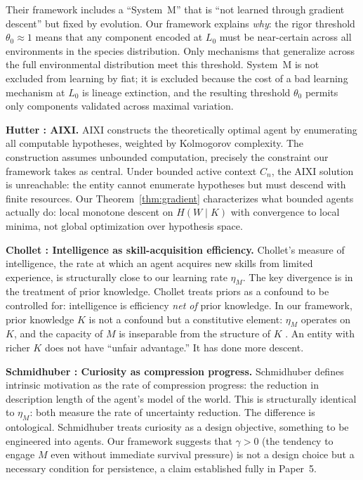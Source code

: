 \documentclass[11pt]{article}
\theoremstyle{definition}
\begin{document}
Their framework includes a ``System~M'' that is ``not learned through
gradient descent'' but fixed by evolution. Our framework explains
\emph{why}: the rigor threshold $\theta_0 \approx 1$ means that any
component encoded at $L_0$ must be near-certain across all
environments in the species distribution. Only mechanisms that
generalize across the full environmental distribution meet this
threshold. System~M is not excluded from learning by fiat; it
is excluded because the cost of a bad learning mechanism at $L_0$ is
lineage extinction, and the resulting threshold $\theta_0$ permits
only components validated across maximal variation.

\textbf{Hutter \cite{Hutter2005}: AIXI.}
AIXI constructs the theoretically optimal agent by enumerating all
computable hypotheses, weighted by Kolmogorov complexity. The
construction assumes unbounded computation, precisely the
constraint our framework takes as central. Under bounded active
context $C_n$, the AIXI solution is unreachable: the entity cannot
enumerate hypotheses but must descend with finite resources. Our
Theorem~\ref{thm:gradient} characterizes what bounded agents actually
do: local monotone descent on $H(W \mid K)$ with convergence to local
minima, not global optimization over hypothesis space.

\textbf{Chollet \cite{Chollet2019}: Intelligence as
skill-acquisition efficiency.}
Chollet's measure of intelligence, the rate at which an agent
acquires new skills from limited experience, is structurally close
to our learning rate $\eta_M$. The key divergence is in the treatment
of prior knowledge. Chollet treats priors as a confound to be
controlled for: intelligence is efficiency \emph{net of} prior
knowledge. In our framework, prior knowledge $K$ is not a confound
but a constitutive element: $\eta_M$ operates on $K$, and the
capacity of $M$ is inseparable from the structure of $K$
\cite{McCarthy2026c}. An entity with richer $K$ does not have
``unfair advantage.'' It has done more descent.

\textbf{Schmidhuber \cite{Schmidhuber2010}: Curiosity as compression
progress.}
Schmidhuber defines intrinsic motivation as the rate of compression
progress: the reduction in description length of the agent's model
of the world. This is structurally identical to $\eta_M$: both
measure the rate of uncertainty reduction. The difference is
ontological. Schmidhuber treats curiosity as a design objective,
something to be engineered into agents. Our framework suggests that
$\gamma > 0$ (the tendency to engage $M$ even without immediate survival
pressure) is not a design choice but a necessary condition for
persistence, a claim established fully in Paper~5.
\end{document}
